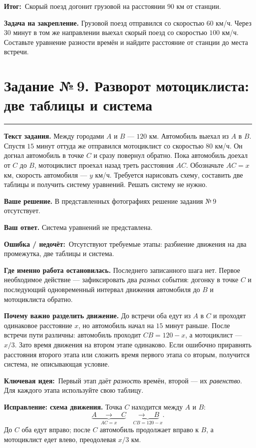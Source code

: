 \documentclass[a4paper,11pt]{article}
\newcommand{\rlabel}[1]{\par\noindent\textbf{\color{darkaccent}#1}\quad}
\newcommand{\errorlabel}{\textcolor{err}{\textbf{Ошибка / недочёт:}}}
\newcommand{\keylabel}{\textcolor{blue!60!black}{\textbf{Ключевая идея:}}}
\newcommand{\finallabel}{\textcolor{teal!60!black}{\textbf{Итог:}}}
\newcommand{\tasktitle}[2]{\clearpage\phantomsection\label{task:#1}\section*{Задание №\,#1. #2}\vspace{-3mm}\textcolor{accent}{\rule{\linewidth}{0.45pt}}}
\begin{document}
\par\noindent\finallabel\ Скорый поезд догонит грузовой на расстоянии $90$ км от станции.

\rlabel{Задача на закрепление.} Грузовой поезд отправился со скоростью $60$ км/ч. Через $30$ минут в том же направлении выехал скорый поезд со скоростью $100$ км/ч. Составьте уравнение разности времён и найдите расстояние от станции до места встречи.

\tasktitle{9}{Разворот мотоциклиста: две таблицы и система}
\rlabel{Текст задания.} Между городами $A$ и $B$ --- $120$ км. Автомобиль выехал из $A$ в $B$. Спустя $15$ минут оттуда же отправился мотоциклист со скоростью $80$ км/ч. Он догнал автомобиль в точке $C$ и сразу повернул обратно. Пока автомобиль доехал от $C$ до $B$, мотоциклист проехал назад треть расстояния $AC$. Обозначьте $AC=x$ км, скорость автомобиля --- $y$ км/ч. Требуется нарисовать схему, составить две таблицы и получить систему уравнений. Решать систему не нужно.

\rlabel{Ваше решение.} В представленных фотографиях решение задания №\,9 отсутствует.

\rlabel{Ваш ответ.} Система уравнений не представлена.

\par\noindent\errorlabel\ Отсутствуют требуемые этапы: разбиение движения на два промежутка, две таблицы и система.

\rlabel{Где именно работа остановилась.} Последнего записанного шага нет. Первое необходимое действие --- зафиксировать два \emph{разных} события: догонку в точке $C$ и последующий одновременный интервал движения автомобиля до $B$ и мотоциклиста обратно.

\rlabel{Почему важно разделить движение.} До встречи оба едут из $A$ в $C$ и проходят одинаковое расстояние $x$, но автомобиль начал на $15$ минут раньше. После встречи пути различны: автомобиль проходит $CB=120-x$, а мотоциклист --- $x/3$. Зато время движения на втором этапе одинаково. Если ошибочно приравнять расстояния второго этапа или сложить время первого этапа со вторым, получится система, не описывающая условие.

\par\noindent\keylabel\ Первый этап даёт \emph{разность} времён, второй --- их \emph{равенство}. Для каждого этапа используйте свою таблицу.

\rlabel{Исправление: схема движения.} Точка $C$ находится между $A$ и $B$:
\[
\underbrace{A\quad\longrightarrow\quad C}_{AC=x}
\quad\underbrace{\longrightarrow\quad B}_{CB=120-x}.
\]
До $C$ оба едут вправо; после $C$ автомобиль продолжает вправо к $B$, а мотоциклист едет влево, преодолевая $x/3$ км.
\end{document}
